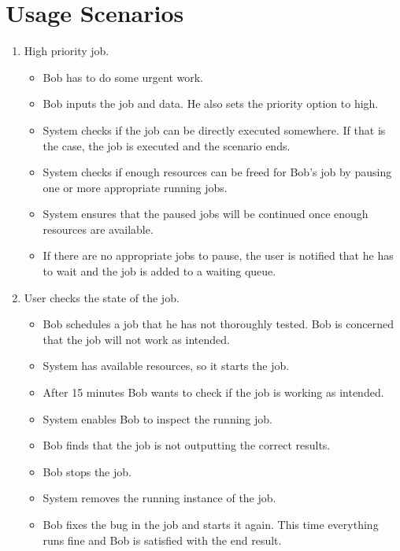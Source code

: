 \section{Usage Scenarios}
\begin{enumerate}
  \item High priority job.
  \begin{itemize}
    \item Bob has to do some urgent work.
    \item Bob inputs the job and data. He also sets the priority option to high.
    \item System checks if the job can be directly executed somewhere.
    If that is the case, the job is executed and the scenario ends.
    \item System checks if enough resources can be freed for Bob's job by pausing one or more appropriate running jobs.
    \item System ensures that the paused jobs will be continued once enough resources are available.
    \item If there are no appropriate jobs to pause, the user is notified that he has to wait and the job is added to a waiting queue.
  \end{itemize}
  \item User checks the state of the job.
  \begin{itemize}
    \item Bob schedules a job that he has not thoroughly tested.
    Bob is concerned that the job will not work as intended.
    \item System has available resources, so it starts the job.
    \item After 15 minutes Bob wants to check if the job is working as intended.
    \item System enables Bob to inspect the running job.
    \item Bob finds that the job is not outputting the correct results.
    \item Bob stops the job.
    \item System removes the running instance of the job.
    \item Bob fixes the bug in the job and starts it again.
    This time everything runs fine and Bob is satisfied with the end result.
  \end{itemize}
\end{enumerate}
